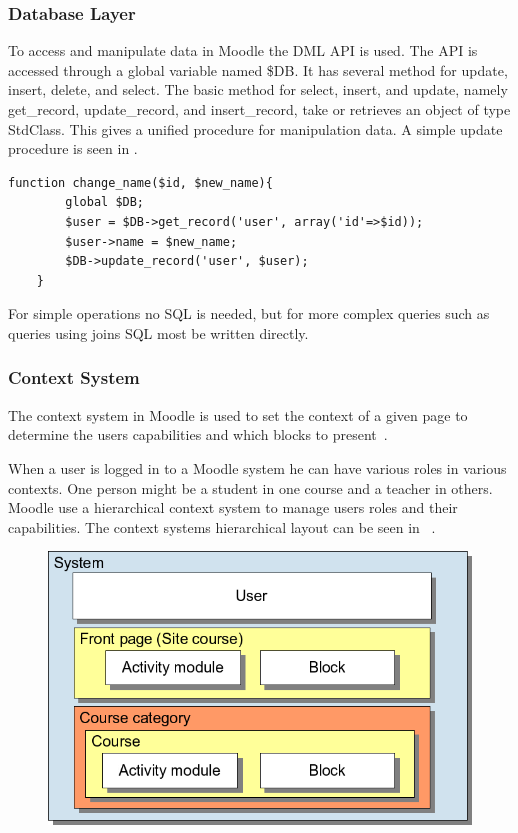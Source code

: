	
	\subsubsection{Database Layer}
	\label{sec:moodleoplatformdbml}
	To access and manipulate data in Moodle the DML API is used.  The API is accessed through a global variable named \$DB. It has several method for update, insert, delete, and select. 
	The basic method for select, insert, and update, namely get\_record, update\_record, and insert\_record, take or retrieves an object of type StdClass. This gives a unified procedure for manipulation data. A simple update procedure is seen in .
	\begin{lstlisting}[style=phpCode, caption=\myCaption{Example of how to change the name of an user}, label=moodlecodeupdate]
	function change_name($id, $new_name){
		global $DB;
		$user = $DB->get_record('user', array('id'=>$id));
		$user->name = $new_name;
		$DB->update_record('user', $user);
	}
	\end{lstlisting}
	For simple operations no SQL is needed, but for more complex queries such as queries using joins SQL most be written directly. 
	
	
	
	\subsubsection{Context System}

The context system in Moodle is used to set the context of a given page to determine the users capabilities and which blocks to present~\cite{moodlerolesandmodules}.
 
When a user is logged in to a Moodle system he can have various roles in various contexts. 
One person might be a student in one course and a teacher in others. 
Moodle use a hierarchical context system to manage users roles and their capabilities. 
The context systems hierarchical layout can be seen in ~\cite{moodlefilemoodlecontext}.
 
 \begin{figure}
	 \centering
		 \includegraphics[width=\textwidth]{images/moodle-contexts.png}
	 \label{fig:moodle-contexts}
 \end{figure}

